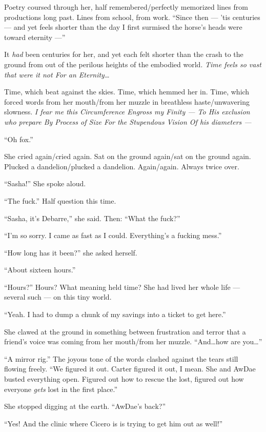 Poetry coursed through her, half remembered/perfectly memorized lines from productions long past. Lines from school, from work. ``Since then — 'tis centuries — and yet feels shorter than the day I first surmised the horse's heads were toward eternity —''

It \emph{had} been centuries for her, and yet each felt shorter than the crash to the ground from out of the perilous heights of the embodied world. \emph{Time feels so vast that were it not For an Eternity\ldots{}}

Time, which beat against the skies. Time, which hemmed her in. Time, which forced words from her mouth/from her muzzle in breathless haste/unwavering slowness. \emph{I fear me this Circumference Engross my Finity — To His exclusion who prepare By Process of Size For the Stupendous Vision Of his diameters —}

``Oh fox.''

She cried again/cried again. Sat on the ground again/sat on the ground again. Plucked a dandelion/plucked a dandelion. Again/again. Always twice over.

``Sasha!'' She spoke aloud.

``The fuck.'' Half question this time.

``Sasha, it's Debarre,'' she said. Then: ``What the fuck?''

``I'm so sorry. I came as fast as I could. Everything's a fucking mess.''

``How long has it been?'' she asked herself.

``About sixteen hours.''

``Hours?'' Hours? What meaning held time? She had lived her whole life — several such — on this tiny world.

``Yeah. I had to dump a chunk of my savings into a ticket to get here.''

She clawed at the ground in something between frustration and terror that a friend's voice was coming from her mouth/from her muzzle. ``And\ldots{}how are you\ldots{}''

``A mirror rig.'' The joyous tone of the words clashed against the tears still flowing freely. ``We figured it out. Carter figured it out, I mean. She and AwDae busted everything open. Figured out how to rescue the lost, figured out how everyone \emph{gets} lost in the first place.''

She stopped digging at the earth. ``AwDae's back?''

``Yes! And the clinic where Cicero is is trying to get him out as well!''

